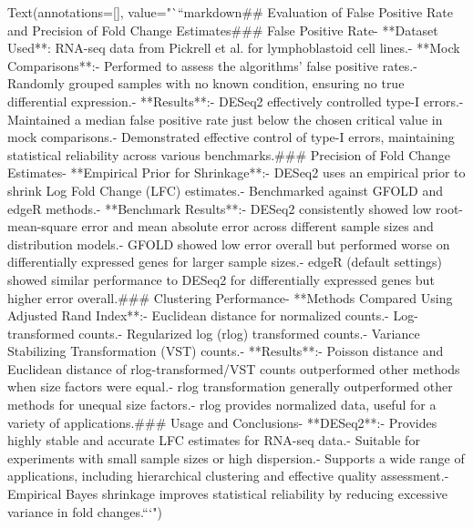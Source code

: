 Text(annotations=[], value="```markdown\n## Evaluation of False Positive Rate and Precision of Fold Change Estimates\n\n### False Positive Rate\n\n- **Dataset Used**: RNA-seq data from Pickrell et al. for lymphoblastoid cell lines.\n- **Mock Comparisons**:\n  - Performed to assess the algorithms' false positive rates.\n  - Randomly grouped samples with no known condition, ensuring no true differential expression.\n- **Results**:\n  - DESeq2 effectively controlled type-I errors.\n  - Maintained a median false positive rate just below the chosen critical value in mock comparisons.\n  - Demonstrated effective control of type-I errors, maintaining statistical reliability across various benchmarks.\n\n### Precision of Fold Change Estimates\n\n- **Empirical Prior for Shrinkage**:\n  - DESeq2 uses an empirical prior to shrink Log Fold Change (LFC) estimates.\n  - Benchmarked against GFOLD and edgeR methods.\n- **Benchmark Results**:\n  - DESeq2 consistently showed low root-mean-square error and mean absolute error across different sample sizes and distribution models.\n  - GFOLD showed low error overall but performed worse on differentially expressed genes for larger sample sizes.\n  - edgeR (default settings) showed similar performance to DESeq2 for differentially expressed genes but higher error overall.\n\n### Clustering Performance\n\n- **Methods Compared Using Adjusted Rand Index**:\n  - Euclidean distance for normalized counts.\n  - Log-transformed counts.\n  - Regularized log (rlog) transformed counts.\n  - Variance Stabilizing Transformation (VST) counts.\n- **Results**:\n  - Poisson distance and Euclidean distance of rlog-transformed/VST counts outperformed other methods when size factors were equal.\n  - rlog transformation generally outperformed other methods for unequal size factors.\n  - rlog provides normalized data, useful for a variety of applications.\n\n### Usage and Conclusions\n\n- **DESeq2**:\n  - Provides highly stable and accurate LFC estimates for RNA-seq data.\n  - Suitable for experiments with small sample sizes or high dispersion.\n  - Supports a wide range of applications, including hierarchical clustering and effective quality assessment.\n  - Empirical Bayes shrinkage improves statistical reliability by reducing excessive variance in fold changes.\n\n```\n")